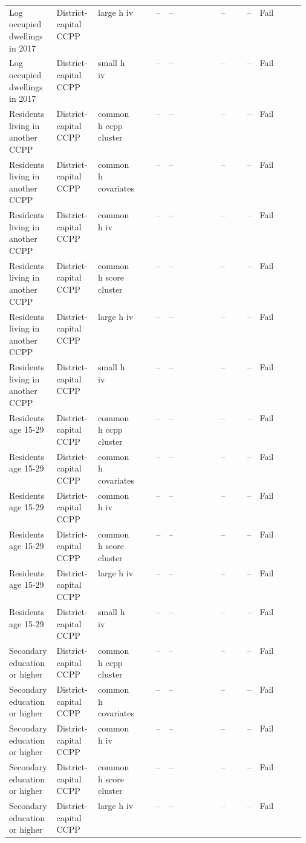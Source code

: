 \begin{longtable}{@{}p{0.16\linewidth}p{0.14\linewidth}p{0.14\linewidth}rp{0.13\linewidth}rrl@{}}
Log occupied dwellings in 2017 & District-capital CCPP & large h iv & -- & -- & -- & -- & Fail \\
Log occupied dwellings in 2017 & District-capital CCPP & small h iv & -- & -- & -- & -- & Fail \\
Residents living in another CCPP & District-capital CCPP & common h ccpp cluster & -- & -- & -- & -- & Fail \\
Residents living in another CCPP & District-capital CCPP & common h covariates & -- & -- & -- & -- & Fail \\
Residents living in another CCPP & District-capital CCPP & common h iv & -- & -- & -- & -- & Fail \\
Residents living in another CCPP & District-capital CCPP & common h score cluster & -- & -- & -- & -- & Fail \\
Residents living in another CCPP & District-capital CCPP & large h iv & -- & -- & -- & -- & Fail \\
Residents living in another CCPP & District-capital CCPP & small h iv & -- & -- & -- & -- & Fail \\
Residents age 15-29 & District-capital CCPP & common h ccpp cluster & -- & -- & -- & -- & Fail \\
Residents age 15-29 & District-capital CCPP & common h covariates & -- & -- & -- & -- & Fail \\
Residents age 15-29 & District-capital CCPP & common h iv & -- & -- & -- & -- & Fail \\
Residents age 15-29 & District-capital CCPP & common h score cluster & -- & -- & -- & -- & Fail \\
Residents age 15-29 & District-capital CCPP & large h iv & -- & -- & -- & -- & Fail \\
Residents age 15-29 & District-capital CCPP & small h iv & -- & -- & -- & -- & Fail \\
Secondary education or higher & District-capital CCPP & common h ccpp cluster & -- & -- & -- & -- & Fail \\
Secondary education or higher & District-capital CCPP & common h covariates & -- & -- & -- & -- & Fail \\
Secondary education or higher & District-capital CCPP & common h iv & -- & -- & -- & -- & Fail \\
Secondary education or higher & District-capital CCPP & common h score cluster & -- & -- & -- & -- & Fail \\
Secondary education or higher & District-capital CCPP & large h iv & -- & -- & -- & -- & Fail \\

\end{longtable}
